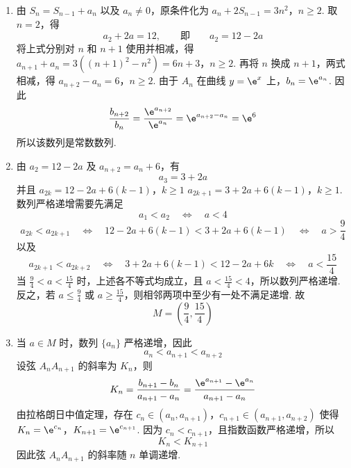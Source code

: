 \begin{solution}
\begin{enumerate}
\item
由 \(S_n=S_{n-1}+a_n\) 以及 \(a_n\neq0\)，原条件化为
\(a_n+2S_{n-1}=3n^2\)，\(n\geqslant2\).
取 \(n=2\)，得
\[
a_2+2a=12,\qquad\text{即}\qquad a_2=12-2a
\]
将上式分别对 \(n\) 和 \(n+1\) 使用并相减，得
\(a_{n+1}+a_n=3\left((n+1)^2-n^2\right)=6n+3\)，\(n\geqslant2\).
再将 \(n\) 换成 \(n+1\)，两式相减，得
\(a_{n+2}-a_n=6\)，\(n\geqslant2\).
由于 \(A_n\) 在曲线 \(y=\e^x\) 上，\(b_n=\e^{a_n}\). 因此
\[
\frac{b_{n+2}}{b_n}
=\frac{\e^{a_{n+2}}}{\e^{a_n}}
=\e^{a_{n+2}-a_n}
=\e^6
\]
所以该数列是常数数列.

\item
由 \(a_2=12-2a\) 及 \(a_{n+2}=a_n+6\)，有
\[
a_3=3+2a
\]
并且
\(a_{2k}=12-2a+6(k-1)\)，\(k\geqslant1\)
\(a_{2k+1}=3+2a+6(k-1)\)，\(k\geqslant1\).
数列严格递增需要先满足
\[
a_1<a_2\quad\Longleftrightarrow\quad a<4
\]
\[
a_{2k}<a_{2k+1}\quad\Longleftrightarrow\quad
12-2a+6(k-1)<3+2a+6(k-1)
\quad\Longleftrightarrow\quad a>\frac{9}{4}
\]
以及
\[
a_{2k+1}<a_{2k+2}\quad\Longleftrightarrow\quad
3+2a+6(k-1)<12-2a+6k
\quad\Longleftrightarrow\quad a<\frac{15}{4}
\]
当 \(\frac{9}{4}<a<\frac{15}{4}\) 时，上述各不等式均成立，且 \(a<\frac{15}{4}<4\)，所以数列严格递增. 反之，若 \(a\leqslant\frac{9}{4}\) 或 \(a\geqslant\frac{15}{4}\)，则相邻两项中至少有一处不满足递增. 故
\[
M=\left(\frac{9}{4},\frac{15}{4}\right)
\]

\item
当 \(a\in M\) 时，数列 \(\{a_n\}\) 严格递增，因此
\[
a_n<a_{n+1}<a_{n+2}
\]
设弦 \(A_nA_{n+1}\) 的斜率为 \(K_n\)，则
\[
K_n=\frac{b_{n+1}-b_n}{a_{n+1}-a_n}
=\frac{\e^{a_{n+1}}-\e^{a_n}}{a_{n+1}-a_n}
\]
由拉格朗日中值定理，存在
\(c_n\in(a_n,a_{n+1})\)，\(c_{n+1}\in(a_{n+1},a_{n+2})\)
使得
\(K_n=\e^{c_n}\)，\(K_{n+1}=\e^{c_{n+1}}\).
因为 \(c_n<c_{n+1}\)，且指数函数严格递增，所以
\[
K_n<K_{n+1}
\]
因此弦 \(A_nA_{n+1}\) 的斜率随 \(n\) 单调递增.
\end{enumerate}
\end{solution}
